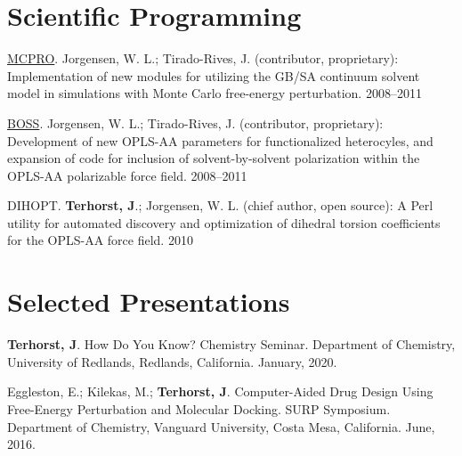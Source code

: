 \documentclass[11pt]{article}
\newcommand{\sciprog}[5]{#1. #2 (#3): #4 #5}
\newcommand{\pres}[8]{#1 #2. #3. #4, #5, #6. #7, #8.}
\newcommand{\presnp}[8]{#1 #2 #3. #4, #5, #6. #7, #8.}
\begin{document}

\section{Scientific Programming}

\sciprog{\href{http://zarbi.chem.yale.edu/software.html}{MCPRO}}
{Jorgensen, W. L.; Tirado-Rives, J.}
{contributor, proprietary}
{Implementation of new modules for utilizing the GB/SA continuum solvent 
model in simulations with Monte Carlo free-energy perturbation.}
{2008--2011}

\sciprog{\href{http://zarbi.chem.yale.edu/software.html}{BOSS}}
{Jorgensen, W. L.; Tirado-Rives, J.}
{contributor, proprietary}
{Development of new OPLS-AA parameters for 
functionalized heterocyles, and expansion of code for 
inclusion of solvent-by-solvent polarization within the 
OPLS-AA polarizable force field.}
{2008--2011}

\sciprog{DIHOPT}
{\textbf{Terhorst, J}.; Jorgensen, W. L.}
{chief author, open source}
{A Perl utility for automated discovery and optimization 
of dihedral torsion coefficients for the OPLS-AA force field.}
{2010}


\section{Selected Presentations}


\presnp{\textbf{Terhorst, J}.}
{How Do You Know?}
{Chemistry Seminar}
{Department of Chemistry}
{University of Redlands}
{Redlands, California}
{January}{2020}

\pres{Eggleston, E.; Kilekas, M.; \textbf{Terhorst, J}.}
{Computer-Aided Drug Design Using Free-Energy Perturbation and Molecular Docking}
{SURP Symposium}
{Department of Chemistry}
{Vanguard University}
{Costa Mesa, California}
{June}{2016}
\end{document}
